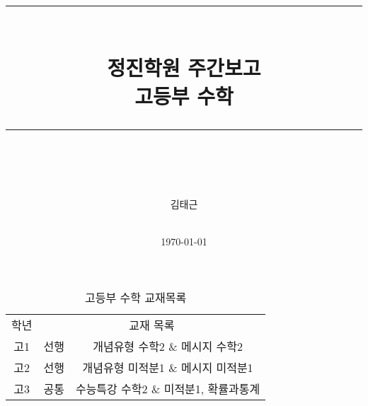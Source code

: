 \documentclass[idxtotoc,hyperref,openany]{labbook} %
\newcommand{\HRule}{\rule{\linewidth}{0.5mm}} %
\begin{document}

\frontmatter %
\title{
\begin{center}
\HRule \\[0.4cm]
{\Huge \bfseries 정진학원 주간보고  \\[0.5cm] \Large 고등부 수학}\\[0.4cm] %
\HRule \\[1.5cm]
\end{center}
}
\author{\LARGE 김태근 \\  \\[2cm]} %
\date{\today} %
\maketitle

\tableofcontents

\mainmatter %












\begin{table}[h]
\centering
\begin{adjustbox}{width=.9\textwidth}
\begin{tabular}{c||c|c}
\toprule
\midrule
학년 & \multicolumn{2}{c}{교재 목록} \\
\hhline{=||==}
고1 & 선행 & 개념유형 수학2 \& 메시지 수학2 \\
\hline
고2 & 선행 & 개념유형 미적분1 \& 메시지 미적분1\\
\hline
\multirow{1}{*}{고3} & 공통 & 수능특강 수학2 \& 미적분1, 확률과통계 \\

\hline
\end{tabular}
\end{adjustbox}
\caption{\label{tab:i} 고등부 수학 교재목록 }
\end{table}
\end{document}
